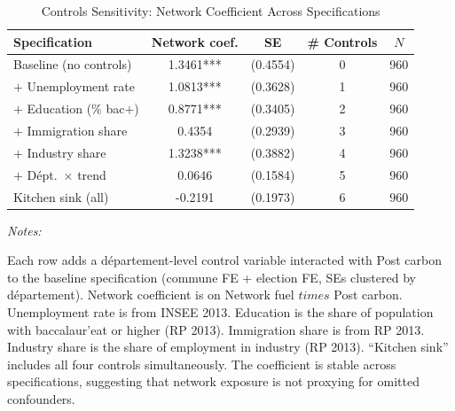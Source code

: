 \begin{table}[!h]
\centering
\caption{Controls Sensitivity: Network Coefficient Across Specifications}
\centering
\fontsize{10}{12}\selectfont
\begin{threeparttable}
\begin{tabular}[t]{lcccc}
\toprule
Specification & Network coef. & SE & \# Controls & $N$\\
\midrule
Baseline (no controls) & 1.3461*** & (0.4554) & 0 & 960\\
$+$ Unemployment rate & 1.0813*** & (0.3628) & 1 & 960\\
$+$ Education (\% bac$+$) & 0.8771*** & (0.3405) & 2 & 960\\
$+$ Immigration share & 0.4354 & (0.2939) & 3 & 960\\
$+$ Industry share & 1.3238*** & (0.3882) & 4 & 960\\
$+$ D\'{e}pt.~$\times$ trend & 0.0646 & (0.1584) & 5 & 960\\
Kitchen sink (all) & -0.2191 & (0.1973) & 6 & 960\\
\bottomrule
\end{tabular}
\begin{tablenotes}
\item \textit{Notes:} 
\item Each row adds a d\'{e}partement-level control variable interacted with Post carbon to the baseline specification (commune FE + election FE, SEs clustered by d\'{e}partement). Network coefficient is on Network fuel $times$ Post carbon. Unemployment rate is from INSEE 2013. Education is the share of population with baccalaur'{e}at or higher (RP 2013). Immigration share is from RP 2013. Industry share is the share of employment in industry (RP 2013). ``Kitchen sink'' includes all four controls simultaneously. The coefficient is stable across specifications, suggesting that network exposure is not proxying for omitted confounders.
\end{tablenotes}
\end{threeparttable}
\end{table}
